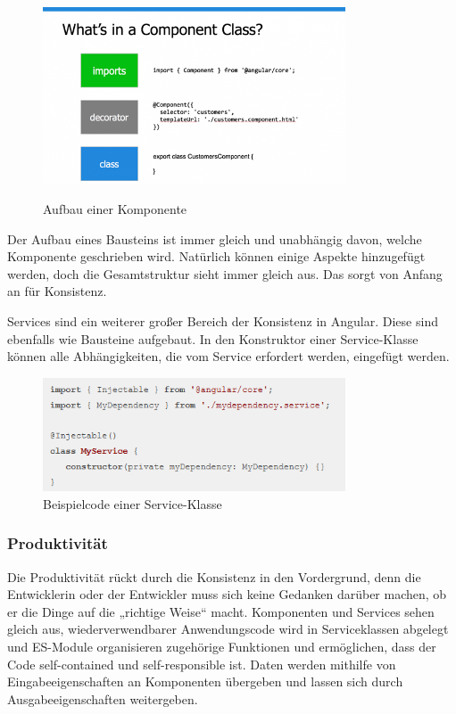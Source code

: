 \begin{figure}[H]
  \centering
  \includegraphics[width=0.8\textwidth]{pics/Komponenten_Klasse.png}
  \caption{Aufbau einer Komponente}
  \cite{AufbauKomponenteBild}
\end{figure}

Der Aufbau eines Bausteins ist immer gleich und unabhängig davon, welche Komponente geschrieben wird. Natürlich können einige Aspekte hinzugefügt werden, doch die Gesamtstruktur sieht immer gleich aus. Das sorgt von Anfang an für Konsistenz.

Services sind ein weiterer großer Bereich der Konsistenz in Angular. Diese sind ebenfalls wie Bausteine aufgebaut. In den Konstruktor einer Service-Klasse können alle Abhängigkeiten, die vom Service erfordert werden, eingefügt werden.

\begin{figure}[H]
  \centering
  \includegraphics[width=0.8\textwidth]{pics/Code_Service.png}
  \caption{Beispielcode einer Service-Klasse}
\end{figure}

\subsubsection{Produktivität}
Die Produktivität rückt durch die Konsistenz in den Vordergrund, denn die Entwicklerin oder der Entwickler muss sich keine Gedanken darüber machen, ob er die Dinge auf die „richtige Weise“ macht. Komponenten und Services sehen gleich aus, wiederverwendbarer Anwendungscode wird in Serviceklassen abgelegt und ES-Module organisieren zugehörige Funktionen und ermöglichen, dass der Code self-contained und self-responsible ist. Daten werden mithilfe von Eingabeeigenschaften an Komponenten übergeben und lassen sich durch Ausgabeeigenschaften weitergeben.

